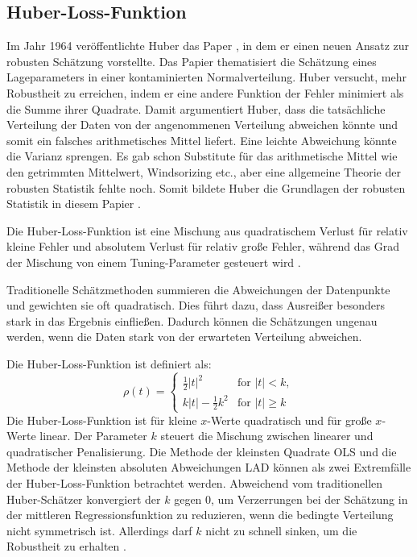\subsection{Huber-Loss-Funktion}
\label{huberregression}
Im Jahr 1964 veröffentlichte Huber das Paper , in dem er einen neuen Ansatz zur robusten Schätzung vorstellte. Das Papier thematisiert die Schätzung eines Lageparameters in einer kontaminierten Normalverteilung. Huber versucht, mehr Robustheit zu erreichen, indem er eine andere Funktion der Fehler minimiert als die Summe ihrer Quadrate. Damit argumentiert Huber, dass die tatsächliche Verteilung der Daten von der angenommenen Verteilung abweichen könnte und somit ein falsches arithmetisches Mittel liefert. Eine leichte Abweichung könnte die Varianz sprengen. Es gab schon Substitute für das arithmetische Mittel wie den getrimmten Mittelwert, Windsorizing etc., aber eine allgemeine Theorie der robusten Statistik fehlte noch. Somit bildete Huber die Grundlagen der robusten Statistik in diesem Papier \cite{huberpapier}. \par
Die Huber-Loss-Funktion ist eine Mischung aus quadratischem Verlust für relativ kleine Fehler und absolutem Verlust für relativ große Fehler, während das Grad der Mischung von einem Tuning-Parameter gesteuert wird \cite{indirekthuber}. 
\par
Traditionelle Schätzmethoden summieren die Abweichungen der Datenpunkte und gewichten sie oft quadratisch. Dies führt dazu, dass Ausreißer besonders stark in das Ergebnis einfließen. Dadurch können die Schätzungen ungenau werden, wenn die Daten stark von der erwarteten Verteilung abweichen.    \par
Die Huber-Loss-Funktion ist definiert als:
\begin{equation}
\rho(t) = 
\begin{cases} 
  \frac{1}{2} |t|^2 & \text{for } |t| < k, \\ 
  k |t| - \frac{1}{2} k^2 & \text{for } |t| \geq k 
\end{cases}
\label{eq:huber}
\end{equation}
Die Huber-Loss-Funktion ist für kleine \(x\)-Werte quadratisch und für große \(x\)-Werte linear. Der Parameter \(k\) steuert die Mischung zwischen linearer und quadratischer Penalisierung. Die Methode der kleinsten Quadrate \ac{OLS} und die Methode der kleinsten absoluten Abweichungen \ac{LAD} können als zwei Extremfälle der Huber-Loss-Funktion betrachtet werden. Abweichend vom traditionellen Huber-Schätzer konvergiert der \(k\) gegen 0, um Verzerrungen bei der Schätzung in der mittleren Regressionsfunktion zu reduzieren, wenn die bedingte Verteilung nicht symmetrisch ist. Allerdings darf \(k\) nicht zu schnell sinken, um die Robustheit zu erhalten \cite{indirekthuber}. \par
